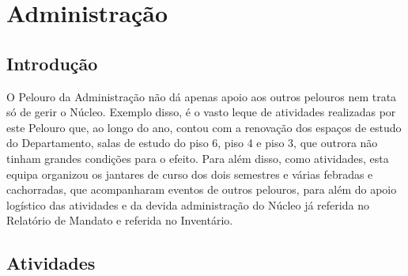 
\section{Administração}

\subsection{Introdução}

O Pelouro da Administração não dá apenas apoio aos outros pelouros nem trata só de gerir o Núcleo. Exemplo disso, é o vasto leque de atividades realizadas por este Pelouro que, ao longo do ano, contou com a renovação dos espaços de estudo do Departamento, salas de estudo do piso 6, piso 4 e piso 3, que outrora não tinham grandes condições para o efeito. Para além disso, como atividades, esta equipa organizou os jantares de curso dos dois semestres e várias febradas e cachorradas, que acompanharam eventos de outros pelouros, para além do apoio logístico das atividades e da devida administração do Núcleo já referida no Relatório de Mandato e referida no Inventário.

\subsection{Atividades}



{ %
	
    
	
    
	
    
	
}
{ %
}



